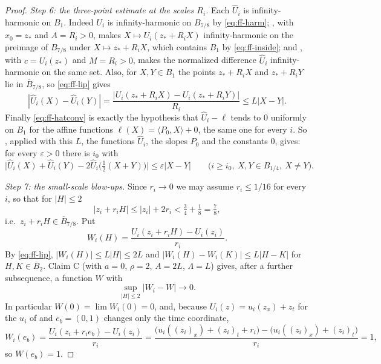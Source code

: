 \begin{proof}
\emph{Step 6: the three-point estimate at the scales $R_i$.}
Each $\widehat U_i$ is infinity-harmonic on $B_1$. Indeed $U_i$ is
infinity-harmonic on $B_{7/8}$ by \eqref{eq:ff-harm};
, with $x_0=z_*$ and $A=R_i>0$, makes
$X\mapsto U_i(z_*+R_iX)$ infinity-harmonic on the preimage of $B_{7/8}$ under
$X\mapsto z_*+R_iX$, which contains $B_1$ by \eqref{eq:ff-inside}; and
, with $c=U_i(z_*)$ and $M=R_i>0$, makes the
normalized difference $\widehat U_i$ infinity-harmonic on the same set. Also,
for $X,Y\in B_1$ the points $z_*+R_iX$ and $z_*+R_iY$ lie in
$\overline B_{7/8}$, so \eqref{eq:ff-lip} gives
\[
  |\widehat U_i(X)-\widehat U_i(Y)|
   =\frac{|U_i(z_*+R_iX)-U_i(z_*+R_iY)|}{R_i}\le L|X-Y| .
\]
Finally \eqref{eq:ff-hatconv} is exactly the hypothesis that
$\widehat U_i-\ell$ tends to $0$ uniformly on $B_1$ for the affine functions
$\ell(X)=\langle P_0,X\rangle+0$, the same one for every $i$. So
, applied with this $L$, the functions
$\widehat U_i$, the slopes $P_0$ and the constants $0$, gives: for every
$\varepsilon>0$ there is $i_0$ with
\begin{equation}\label{eq:ff-threepoint}
  \bigl|\widehat U_i(X)+\widehat U_i(Y)
     -2\widehat U_i\bigl(\tfrac12(X+Y)\bigr)\bigr|\le\varepsilon|X-Y|
  \qquad\bigl(i\ge i_0,\ X,Y\in B_{1/4},\ X\ne Y\bigr).
\end{equation}

\emph{Step 7: the small-scale blow-ups.}
Since $r_i\to0$ we may assume $r_i\le1/16$ for every $i$, so that for $|H|\le2$
\[
  |z_i+r_iH|\le|z_i|+2r_i<\tfrac34+\tfrac18=\tfrac78 ,
\]
i.e.\ $z_i+r_iH\in\overline B_{7/8}$. Put
\[
  W_i(H)=\frac{U_i(z_i+r_iH)-U_i(z_i)}{r_i}.
\]
By \eqref{eq:ff-lip}, $|W_i(H)|\le L|H|\le2L$ and
$|W_i(H)-W_i(K)|\le L|H-K|$ for $H,K\in\overline B_2$. Claim C (with $a=0$,
$\rho=2$, $A=2L$, $\Lambda=L$) gives, after a further subsequence, a function
$W$ with
\begin{equation}\label{eq:ff-Wconv}
  \sup_{|H|\le2}|W_i-W|\longrightarrow0 .
\end{equation}
In particular $W(0)=\lim W_i(0)=0$, and, because $U_i(z)=u_i(z_x)+z_t$ for the
$u_i$ of  and $e_b=(0,1)$ changes only the time
coordinate,
\begin{equation}\label{eq:ff-Web}
  W_i(e_b)=\frac{U_i(z_i+r_ie_b)-U_i(z_i)}{r_i}
    =\frac{\bigl(u_i((z_i)_x)+(z_i)_t+r_i\bigr)
            -\bigl(u_i((z_i)_x)+(z_i)_t\bigr)}{r_i}=1,
\end{equation}
so $W(e_b)=1$.


\end{proof}
